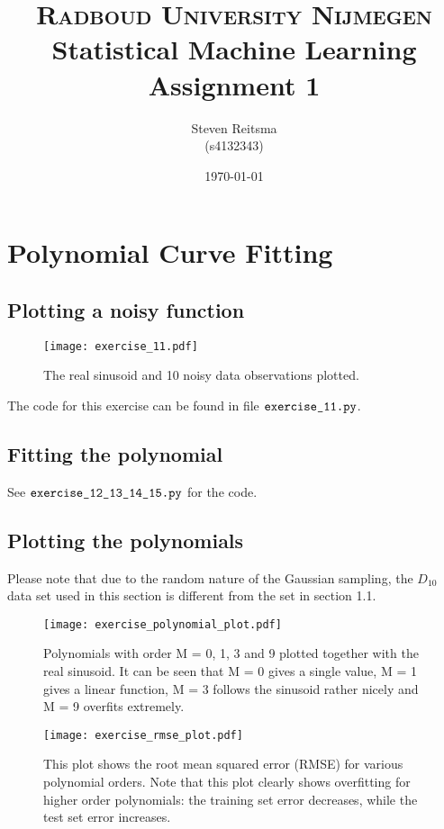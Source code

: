 \documentclass[paper=a4, fontsize=10pt]{scrartcl} %
\title{	
\normalfont \normalsize 
\textsc{Radboud University Nijmegen}  %
\horrule{0.5pt} \\[0.3cm] %
\huge Statistical Machine Learning \\ Assignment 1 \\ %
\horrule{2pt}  %
}
\author{Steven Reitsma \\ (s4132343)} %
\date{\normalsize\today} %
\numberwithin{equation}{section} %
\numberwithin{figure}{section} %
\numberwithin{table}{section} %
\begin{document}
\maketitle %

\section{Polynomial Curve Fitting}
\subsection{Plotting a noisy function}
\begin{figure}[H]
	\centering
	\texttt{[image: exercise\_11.pdf]}
	\caption{The real sinusoid and 10 noisy data observations plotted.}
\end{figure}

The code for this exercise can be found in file $\verb|exercise_11.py|$.

\subsection{Fitting the polynomial}
See $\verb|exercise_12_13_14_15.py|$ for the code.

\subsection{Plotting the polynomials}
Please note that due to the random nature of the Gaussian sampling, the $D_{10}$ data set used in this section is different from the set in section 1.1.
\begin{figure}[H]
	\centering
	\texttt{[image: exercise\_polynomial\_plot.pdf]}
	\caption{Polynomials with order M = 0, 1, 3 and 9 plotted together with the real sinusoid. It can be seen that M = 0 gives a single value, M = 1 gives a linear function, M = 3 follows the sinusoid rather nicely and M = 9 overfits extremely.}
\end{figure}

\begin{figure}[H]
	\centering
	\texttt{[image: exercise\_rmse\_plot.pdf]}
	\caption{This plot shows the root mean squared error (RMSE) for various polynomial orders. Note that this plot clearly shows overfitting for higher order polynomials: the training set error decreases, while the test set error increases.}
\end{figure}
\end{document}
